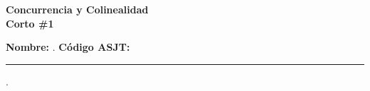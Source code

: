 \begin{center} \textbf
{
    \Large Concurrencia y Colinealidad \\ \vspace{2mm}Corto \#1
}
\end{center}

\textbf{Nombre:} \hrulefill. \textbf{ Código ASJT:} \rule{2cm}{0.1mm}.
\vspace{-4mm}

